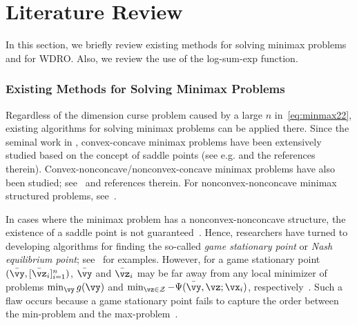 \section{Literature Review}
\label{sec:liter}
	
	In this section, we briefly review %
	existing methods for solving minimax problems %
	and for WDRO. Also, we review the use of the log-sum-exp function. %
	
	\subsubsection{Existing Methods for Solving Minimax Problems}
	Regardless of the dimension curse problem caused by a large $n$ in~\eqref{eq:minmax22}, existing algorithms for solving minimax problems can be applied there.
	Since the seminal work in \cite{v1928theorie}, convex-concave minimax problems have been extensively studied based on the concept of saddle points (see e.g. \cite{chen2014optimal,hamedani2021primal,zhao2022accelerated,daskalakis2018limit,lan2023novel, yan2022adaptive, lin2020near} and the references therein). 
	Convex-nonconcave/nonconvex-concave minimax problems have also been studied; see~\cite{zhang2024generalization,xu2023unified, lin2020gradient, kong2021accelerated, zhao2024primal, rafique2022weakly, lin2020near, mancino2023variance,zhang2022sapd+,zhang2024jointly,xu2024decentralized} and references therein. For nonconvex-nonconcave minimax structured problems, see~\cite{Wang2020On,li2022nonsmooth,diakonikolas2021efficient,grimmer2022landscape,yang2022faster, adolphs2019local, daskalakis2018limit,liu2021first,fiez2021local,mazumdar2019finding}. 
	
	In cases where the minimax problem has a nonconvex-nonconcave structure, the existence of a saddle point is not guaranteed~\cite{jiang2022optimality}. 
	Hence, researchers have turned to developing algorithms for finding the so-called \emph{game stationary point} or \textit{Nash equilibrium point}; see~\cite{xu2023unified,nouiehed2019solving,jiang2022optimality,liu2021first,li2022nonsmooth} for examples.  
	However, for a game stationary  point $(\bar{\vy}, [\bar{\vz}_i]^n_{i=1})$, $\bar{\vy}$ and $\bar{\vz}_i$ may be far away from any local minimizer of problems $\min_{\vy}g(\vy)$ and $\min_{\vz\in\mathcal{Z}}-\Psi(\bar{ \vy},\vz;\vx_i)$, respectively~\cite{jiang2022optimality}. Such a flaw occurs because a game stationary point fails to capture the order between the min-problem and the max-problem~\cite{lin2020gradient}.  
	
